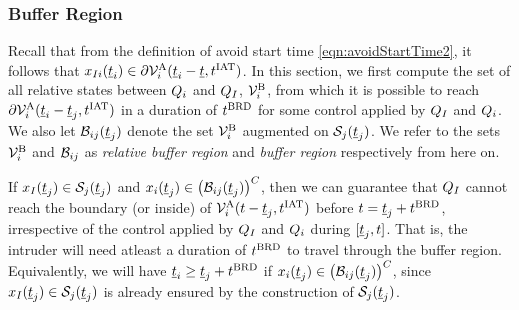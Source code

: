 \subsubsection{Buffer Region} \label{sec:buffRegion_case1}
Recall that from the definition of avoid start time \eqref{eqn:avoidStartTime2}, it follows that $x_{I i}(\underline{t}_i) \in \partial \mathcal{V}^{\text{A}}_{i}(\underline{t}_i-\underline{t}, t^\text{IAT})$. In this section, we first compute the set of all relative states between $Q_i$ and $Q_{I}$, $\mathcal{V}^{\text{B}}_{i}$, from which it is possible to reach $\partial \mathcal{V}^{\text{A}}_{i}(\underline{t}_i-\underline{t}_j, t^\text{IAT})$ in a duration of $t^\text{BRD}$ for some control applied by $Q_{I}$ and $Q_i$. We also let $\mathcal{B}_{ij}(\underline{t}_j)$ denote the set $\mathcal{V}^{\text{B}}_{i}$ augmented on $\mathcal{S}_j(\underline{t}_j)$. We refer to the sets $\mathcal{V}^{\text{B}}_{i}$ and $\mathcal{B}_{ij}$ as \textit{relative buffer region} and \textit{buffer region} respectively from here on.

If $x_{I}(\underline{t}_j) \in \mathcal{S}_j(\underline{t}_j)$ and $x_i(\underline{t}_j) \in \left(\mathcal{B}_{ij}(\underline{t}_j)\right)^C$, then we can guarantee that $Q_{I}$ cannot reach the boundary (or inside) of $\mathcal{V}^{\text{A}}_{i}(t-\underline{t}_j, t^\text{IAT})$ before $t = \underline{t}_j + t^\text{BRD}$, irrespective of the control applied by $Q_{I}$ and $Q_i$ during $[\underline{t}_j, t]$. That is, the intruder will need atleast a duration of $t^\text{BRD}$ to travel through the buffer region. Equivalently, we will have $\underline{t}_i \geq \underline{t}_j + t^\text{BRD}$ if $x_i(\underline{t}_j) \in \left(\mathcal{B}_{ij}(\underline{t}_j)\right)^C$, since $x_{I}(\underline{t}_j) \in \mathcal{S}_j(\underline{t}_j)$ is already ensured by the construction of $\mathcal{S}_j(\underline{t}_j)$.
%
%

